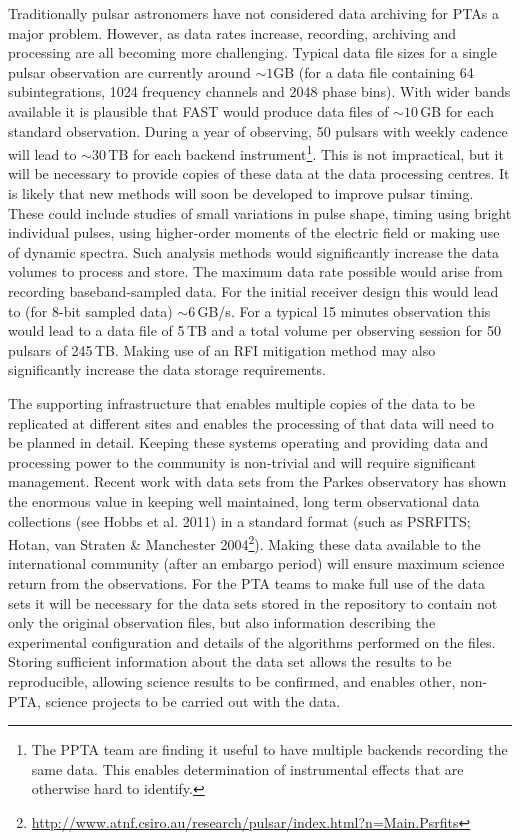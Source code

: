 \documentclass{raa}            %
\begin{document}
Traditionally pulsar astronomers have not considered data archiving for PTAs a major problem.  However, as data rates increase, recording, archiving and processing are all becoming more challenging. Typical data file sizes for a single pulsar observation are currently around $\sim 1$GB (for a data file containing 64 subintegrations, 1024 frequency channels and 2048 phase bins).  With wider bands available it is plausible that FAST would produce data files of $\sim 10$\,GB for each standard observation. During a year of observing, 50 pulsars with weekly cadence will lead to $\sim 30$\,TB for each backend instrument\footnote{The PPTA team are finding it useful to have multiple backends recording the same data.  This enables determination of instrumental effects that are otherwise hard to identify.}.  This is not impractical, but it will be necessary to provide copies of these data at the data processing centres.  It is likely that new methods will soon be developed to improve pulsar timing.  These could include studies of small variations in pulse shape, timing using bright individual pulses, using higher-order moments of the electric field or making use of dynamic spectra. Such analysis methods would significantly increase the data volumes to process and store. The maximum data rate possible would arise from recording baseband-sampled data.  For the initial receiver design this would lead to (for 8-bit sampled data) $\sim 6$\,GB/s. For a typical 15 minutes observation this would lead to a data file of 5\,TB and a total volume per observing session for 50 pulsars of 245\,TB.  Making use of an RFI mitigation method may also significantly increase the data storage requirements.

The supporting infrastructure that enables multiple copies of the data to be replicated at different sites and enables the processing of that data will need to be planned in detail.  Keeping these systems operating and providing data and processing power to the community is non-trivial and will require significant management. Recent work with data sets from the Parkes observatory has shown the enormous value in keeping well maintained, long term observational data collections (see Hobbs et al. 2011\nocite{hmm+11}) in a standard format (such as PSRFITS; Hotan, van Straten \& Manchester 2004\nocite{hvm04}\footnote{\url{http://www.atnf.csiro.au/research/pulsar/index.html?n=Main.Psrfits}}).  Making these data available to the international community (after an embargo period) will ensure maximum science return from the observations. For the PTA teams to make full use of the data sets it will be necessary for the data sets stored in the repository to contain not only the original observation files, but also information describing the experimental configuration and details of the algorithms performed on the files.  Storing sufficient information about the data set allows the results to be reproducible, allowing science results to be confirmed, and enables other, non-PTA, science projects to be carried out with the data.
\end{document}
